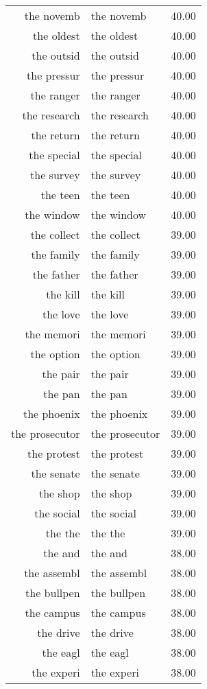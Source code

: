 \begin{table}[ht]
\begin{tabular}{rlr}
  the novemb & the novemb & 40.00 \\ 
  the oldest & the oldest & 40.00 \\ 
  the outsid & the outsid & 40.00 \\ 
  the pressur & the pressur & 40.00 \\ 
  the ranger & the ranger & 40.00 \\ 
  the research & the research & 40.00 \\ 
  the return & the return & 40.00 \\ 
  the special & the special & 40.00 \\ 
  the survey & the survey & 40.00 \\ 
  the teen & the teen & 40.00 \\ 
  the window & the window & 40.00 \\ 
  the collect & the collect & 39.00 \\ 
  the family & the family & 39.00 \\ 
  the father & the father & 39.00 \\ 
  the kill & the kill & 39.00 \\ 
  the love & the love & 39.00 \\ 
  the memori & the memori & 39.00 \\ 
  the option & the option & 39.00 \\ 
  the pair & the pair & 39.00 \\ 
  the pan & the pan & 39.00 \\ 
  the phoenix & the phoenix & 39.00 \\ 
  the prosecutor & the prosecutor & 39.00 \\ 
  the protest & the protest & 39.00 \\ 
  the senate & the senate & 39.00 \\ 
  the shop & the shop & 39.00 \\ 
  the social & the social & 39.00 \\ 
  the the & the the & 39.00 \\ 
  the and & the and & 38.00 \\ 
  the assembl & the assembl & 38.00 \\ 
  the bullpen & the bullpen & 38.00 \\ 
  the campus & the campus & 38.00 \\ 
  the drive & the drive & 38.00 \\ 
  the eagl & the eagl & 38.00 \\ 
  the experi & the experi & 38.00 \\ 

\end{tabular}
\end{table}
